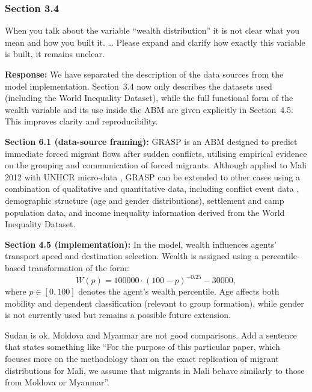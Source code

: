 \documentclass[11pt,a4paper]{article}
\begin{document}
\subsubsection*{Section 3.4}

\begin{reviewbox}
When you talk about the variable ``wealth distribution'' it is not clear what you mean and how you built it. \ldots{} Please expand and clarify how exactly this variable is built, it remains unclear.
\end{reviewbox}

\textbf{Response:} We have separated the description of the data sources from the model implementation.
Section~3.4 now only describes the datasets used (including the World Inequality Dataset), while the full
functional form of the wealth variable and its use inside the ABM are given explicitly in Section~4.5. This
improves clarity and reproducibility.

\vspace{0.3cm}
\begin{updatebox}
\textbf{Section 6.1 (data-source framing):} GRASP is an ABM designed to predict immediate forced migrant
flows after sudden conflicts, utilising empirical evidence on the grouping and communication of forced
migrants. Although applied to Mali 2012 with UNHCR micro-data \citep{He-In}, GRASP can be extended to other
cases using a combination of qualitative and quantitative data, including conflict event data
\citep{243-acled2024data}, demographic structure (age and gender distributions), settlement and camp
population data, and income inequality information derived from the World Inequality Dataset.

\medbreak
\textbf{Section 4.5 (implementation):} In the model, wealth influences agents' transport speed and destination
selection. Wealth is assigned using a percentile-based transformation of the form:
\begin{equation}
W(p) = 100000 \cdot (100 - p)^{-0.25} - 30000,
\end{equation}
where \(p \in [0,100]\) denotes the agent's wealth percentile. Age affects both mobility and dependent
classification (relevant to group formation), while gender is not currently used but remains a possible
future extension.
\end{updatebox}

\vspace{0.3cm}
\begin{reviewbox}
Sudan is ok, Moldova and Myanmar are not good comparisons. Add a sentence that states something like ``For the purpose of this particular paper, which focuses more on the methodology than on the exact replication of migrant distributions for Mali, we assume that migrants in Mali behave similarly to those from Moldova or Myanmar''.
\end{reviewbox}
\end{document}
